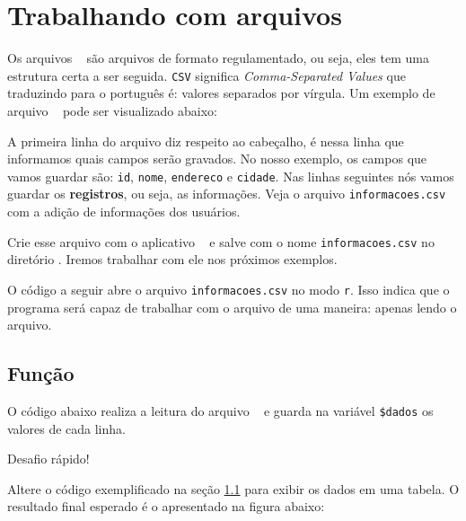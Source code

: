 \section{Trabalhando com arquivos \csvextensao}
\label{trabalhando-com-arquivos-csv}

Os arquivos \csvextensao~ são arquivos de formato regulamentado, ou seja, eles tem
uma estrutura certa a ser seguida. \texttt{CSV} significa \textit{Comma-Separated Values}
que traduzindo para o português é: valores separados por vírgula. Um exemplo de arquivo 
\csvextensao~ pode ser visualizado abaixo:



A primeira linha do arquivo diz respeito ao cabeçalho, é nessa linha que informamos
quais campos serão gravados. No nosso exemplo, os campos que vamos guardar são:
\texttt{id}, \texttt{nome}, \texttt{endereco} e \texttt{cidade}. Nas linhas seguintes
nós vamos guardar os \textbf{registros}, ou seja, as informações. Veja o arquivo
\texttt{informacoes.csv} com a adição de informações dos usuários.



Crie esse arquivo com o aplicativo \sublime~ e salve com o nome \texttt{informacoes.csv}
no diretório . Iremos trabalhar com ele nos próximos
exemplos.

O código a seguir abre o arquivo \texttt{informacoes.csv} no modo \texttt{r}. Isso 
indica que o programa será capaz de trabalhar com o arquivo de uma maneira: 
apenas lendo o arquivo.

\subsection{Função \funcaogetcsv}
\label{funcao-getcsv}

O código abaixo realiza a leitura do arquivo \csvextensao~ e guarda na variável
\texttt{\$dados} os valores de cada linha.




\begin{framed}
{\Large Desafio rápido!}

Altere o código exemplificado na seção \ref{funcao-getcsv} para exibir os dados
em uma tabela. O resultado final esperado é o apresentado na figura abaixo:


\end{framed}

